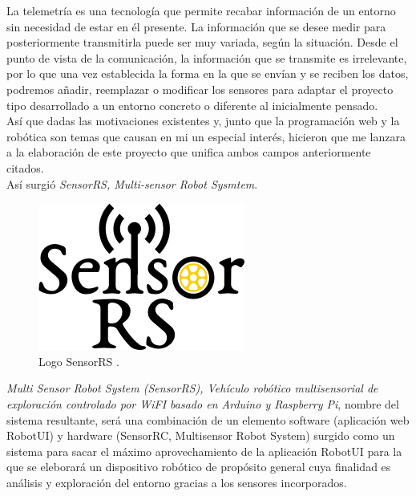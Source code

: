 La telemetría es una tecnología que permite recabar información de un entorno sin necesidad de estar en él presente. 
La información que se desee medir para posteriormente transmitirla puede ser muy variada, según la situación. Desde el punto de vista de la comunicación, la información que se 
transmite es irrelevante, por lo que una vez establecida la forma en la que se envían y se reciben los datos, podremos añadir, reemplazar o modificar los sensores para adaptar el
proyecto tipo desarrollado a un entorno concreto o diferente al inicialmente pensado.\\

Así que dadas las motivaciones existentes y, junto que la programación web y la robótica son temas que causan en mi un especial interés, hicieron que me lanzara a la elaboración de este
proyecto que unifica ambos campos anteriormente citados.\\

Así surgió \emph{SensorRS, Multi-sensor Robot Sysmtem}.\\

\begin{figure}[H]
  \begin{center}
    \includegraphics[scale=0.8]{imagenes/logotipo_sensor_rs.png}
  \end{center}
  \label{fig:logo}
 \caption{Logo SensorRS \protect\footnotemark.}
\end{figure}


\emph{Multi Sensor Robot System (SensorRS), Vehículo robótico multisensorial de exploración controlado por WiFI basado en Arduino y Raspberry Pi}, nombre del sistema resultante, será una combinación de un elemento software (aplicación web RobotUI) y hardware (SensorRC, Multisensor
Robot System) surgido como un sistema para sacar el máximo aprovechamiento de la aplicación RobotUI para la que se eleborará un dispositivo robótico de propósito general cuya finalidad es
análisis y exploración del entorno gracias a los sensores incorporados.\\

